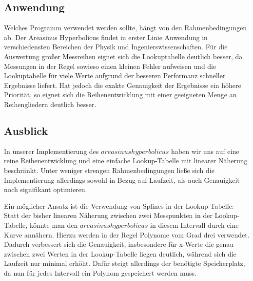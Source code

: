 \documentclass[course=erap] {aspdoc}
\begin{document}
 
     
     \subsection{Anwendung}
     Welches Programm verwendet werden sollte, hängt von den Rahmenbedingungen ab.
     Der Areasinus Hyperbolicus findet in erster Linie Anwendung in verschiedensten Bereichen der Physik und Ingenierswissenschaften.
     Für die Auswertung großer Messreihen eignet sich die Lookuptabelle deutlich besser, da Messungen in der Regel sowieso einen kleinen Fehler aufweisen und die Lookuptabelle für viele Werte aufgrund der besseren Performanz schneller Ergebnisse liefert.
     Hat jedoch die exakte Genauigkeit der Ergebnisse ein höhere Priorität, so eignet sich die Reihenentwicklung mit einer geeigneten Menge an Reihengliedern deutlich besser.
 
     \subsection{Ausblick}
 
     In unserer Implementierung des $areasinus hyperbolicus$ haben wir uns auf eine reine Reihenentwicklung und eine einfache Lookup-Tabelle mit linearer Näherung beschränkt.
     Unter weniger strengen Rahmenbedingungen ließe sich die Implementierung allerdings sowohl in Bezug auf Laufzeit, als auch Genauigkeit noch signifikant optimieren. 
     
     Ein möglicher Ansatz ist die Verwendung von Splines in der Lookup-Tabelle: Statt der bisher linearen Näherung zwischen zwei Messpunkten in der Lookup-Tabelle, könnte man den $areasinus hyperbolicus$ in diesem Intervall durch eine Kurve annähern.
     Hierzu werden in der Regel Polynome vom Grad drei verwendet.
     Dadurch verbessert sich die Genauigkeit, insbesondere für x-Werte die genau zwischen zwei Werten in der Lookup-Tabelle liegen deutlich, während sich die Laufzeit nur minimal erhöht.
     Dafür steigt allerdings der benötigte Speicherplatz, da nun für jedes Intervall ein Polynom gespeichert werden muss.
     
\end{document}
